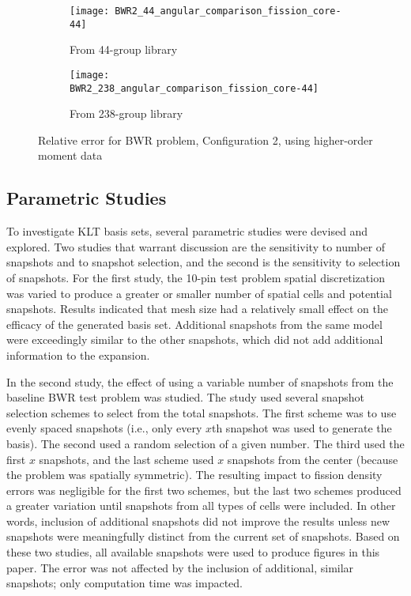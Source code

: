\documentclass[5p,times,twocolumn,10pt]{elsarticle}
\begin{document}
  \begin{figure*}[!ht]
    \centering
    \begin{subfigure}{0.5\textwidth}
      \centering
      \texttt{[image: BWR2\_44\_angular\_comparison\_fission\_core-44]}
      \caption{From 44-group library}
      \label{fig:BWR2_angularA}
    \end{subfigure}%
    \begin{subfigure}{0.5\textwidth}
      \centering
      \texttt{[image: BWR2\_238\_angular\_comparison\_fission\_core-44]}
      \caption{From 238-group library}
      \label{fig:BWR2_angularB}
    \end{subfigure}
    \caption{Relative error for BWR problem, Configuration 2, using higher-order moment data}
    \label{fig:BWR2_angular}
  \end{figure*}
  
  \subsection{Parametric Studies}
  
  To investigate KLT basis sets, several parametric studies were devised and explored.  Two studies that warrant discussion are
  the sensitivity to number of snapshots and to snapshot selection, and the second is the
  sensitivity to selection of snapshots.  For the first study, the 10-pin test problem spatial discretization was varied to produce 
  a greater or smaller number of spatial cells and potential snapshots. Results indicated that mesh size had a relatively 
  small effect on the efficacy of the generated basis set.  Additional snapshots from the same model were exceedingly similar
  to the other snapshots, which did not add additional information to the expansion. 
  
  In the second study, the effect of using a variable number of snapshots from the baseline BWR test problem was studied.  The study 
  used several snapshot selection schemes to select from the total snapshots.  The first scheme was to use evenly spaced snapshots (i.e., only
  every $x$th snapshot was used to generate the basis).  The second used a random selection of a given number.  The third used
  the first $x$ snapshots, and the last scheme used $x$ snapshots from the center (because the problem was spatially symmetric). The
  resulting impact to fission density errors was negligible for the first two schemes, but the last two schemes produced a greater variation until snapshots 
  from all types of cells were included.  In other words, inclusion of additional snapshots did not improve the results unless 
  new snapshots were meaningfully distinct from the current set of snapshots.  Based on these two studies, all available snapshots 
  were used to produce figures in this paper.  The error was not affected by the inclusion of additional, similar snapshots; only 
  computation time was impacted.
  
\end{document}
